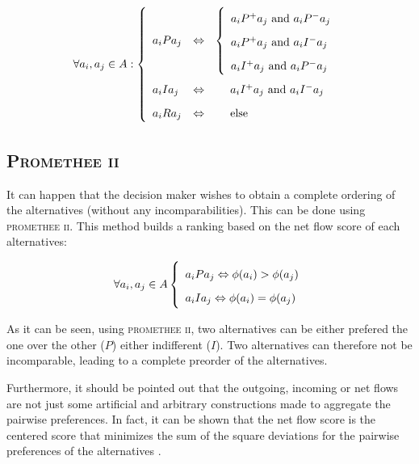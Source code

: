 \begin{equation}
  \forall a_i, a_j \in A: \left\{
    \renewcommand{\arraystretch}{1.75}
    \begin{array}{l l}
      a_iPa_j  & \Leftrightarrow \ \ \left\{
          \begin{array}{l }
              a_iP^+a_j \text{ and } a_iP^-a_j \\
              a_iP^+a_j \text{ and } a_iI^-a_j \\
              a_iI^+a_j \text{ and } a_iP^-a_j \\
          \end{array} \right . \\
      a_iIa_j & \Leftrightarrow \qquad a_iI^+a_j \text{ and } a_iI^-a_j \\
      a_iRa_j & \Leftrightarrow \qquad \text{else} \\
    \end{array} \right . \\
    \label{eq:PI_ranking}
\end{equation}



\subsection{\textsc{Promethee ii}} \label{sec:decision_aid_pii}

It can happen that the decision maker wishes to obtain a complete ordering of the alternatives (without any incomparabilities). This can be done using \textsc{promethee ii}. This method builds a ranking based on the net flow score of each alternatives:

\begin{equation}
    \forall a_i,a_j \in A \left \{
        \begin{array}[]{l}
            a_iPa_j \Leftrightarrow \phi(a_i) > \phi(a_j) \\
            a_iIa_j \Leftrightarrow \phi(a_i) = \phi(a_j) \\
        \end{array}
        \right .
    \label{eq:PII_ranking}
\end{equation}

As it can be seen, using \textsc{promethee ii}, two alternatives can be either prefered the one over the other ($P$) either indifferent ($I$). Two alternatives can therefore not be incomparable, leading to a complete preorder of the alternatives.

Furthermore, it should be pointed out that the outgoing, incoming or net flows are not just some artificial and arbitrary constructions made to aggregate the pairwise preferences.
In fact, it can be shown that the net flow score is the centered score that minimizes the sum of the square deviations for the pairwise preferences of the alternatives \cite{mareschal2008rank}.

